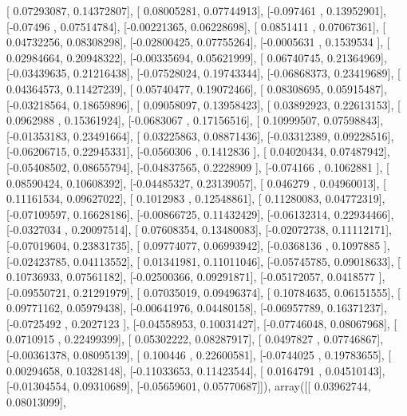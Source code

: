 \documentclass{article}
\begin{document}
       [ 0.07293087,  0.14372807],
       [ 0.08005281,  0.07744913],
       [-0.097461  ,  0.13952901],
       [-0.07496   ,  0.07514784],
       [-0.00221365,  0.06228698],
       [ 0.0851411 ,  0.07067361],
       [ 0.04732256,  0.08308298],
       [-0.02800425,  0.07755264],
       [-0.0005631 ,  0.1539534 ],
       [ 0.02984664,  0.20948322],
       [-0.00335694,  0.05621999],
       [ 0.06740745,  0.21364969],
       [-0.03439635,  0.21216438],
       [-0.07528024,  0.19743344],
       [-0.06868373,  0.23419689],
       [ 0.04364573,  0.11427239],
       [ 0.05740477,  0.19072466],
       [ 0.08308695,  0.05915487],
       [-0.03218564,  0.18659896],
       [ 0.09058097,  0.13958423],
       [ 0.03892923,  0.22613153],
       [ 0.0962988 ,  0.15361924],
       [-0.0683067 ,  0.17156516],
       [ 0.10999507,  0.07598843],
       [-0.01353183,  0.23491664],
       [ 0.03225863,  0.08871436],
       [-0.03312389,  0.09228516],
       [-0.06206715,  0.22945331],
       [-0.0560306 ,  0.1412836 ],
       [ 0.04020434,  0.07487942],
       [-0.05408502,  0.08655794],
       [-0.04837565,  0.2228909 ],
       [-0.074166  ,  0.1062881 ],
       [ 0.08590424,  0.10608392],
       [-0.04485327,  0.23139057],
       [ 0.046279  ,  0.04960013],
       [ 0.11161534,  0.09627022],
       [ 0.1012983 ,  0.12548861],
       [ 0.11280083,  0.04772319],
       [-0.07109597,  0.16628186],
       [-0.00866725,  0.11432429],
       [-0.06132314,  0.22934466],
       [-0.0327034 ,  0.20097514],
       [ 0.07608354,  0.13480083],
       [-0.02072738,  0.11112171],
       [-0.07019604,  0.23831735],
       [ 0.09774077,  0.06993942],
       [-0.0368136 ,  0.1097885 ],
       [-0.02423785,  0.04113552],
       [ 0.01341981,  0.11011046],
       [-0.05745785,  0.09018633],
       [ 0.10736933,  0.07561182],
       [-0.02500366,  0.09291871],
       [-0.05172057,  0.0418577 ],
       [-0.09550721,  0.21291979],
       [ 0.07035019,  0.09496374],
       [ 0.10784635,  0.06151555],
       [ 0.09771162,  0.05979438],
       [-0.00641976,  0.04480158],
       [-0.06957789,  0.16371237],
       [-0.0725492 ,  0.2027123 ],
       [-0.04558953,  0.10031427],
       [-0.07746048,  0.08067968],
       [ 0.0710915 ,  0.22499399],
       [ 0.05302222,  0.08287917],
       [ 0.0497827 ,  0.07746867],
       [-0.00361378,  0.08095139],
       [ 0.100446  ,  0.22600581],
       [-0.0744025 ,  0.19783655],
       [ 0.00294658,  0.10328148],
       [-0.11033653,  0.11423544],
       [ 0.0164791 ,  0.04510143],
       [-0.01304554,  0.09310689],
       [-0.05659601,  0.05770687]]), array([[ 0.03962744,  0.08013099],
\end{document}
